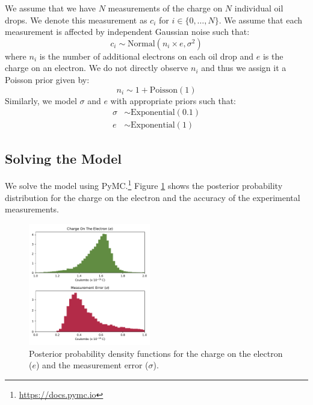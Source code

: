 \documentclass[10pt, twocolumn, a4paper]{article}
\begin{document}
We assume that we have $N$ measurements of the charge on $N$ individual oil drops. We denote this measurement as $c_i$ for $i \in \{0, \dots, N\}$. We assume that each measurement is affected by independent Gaussian noise such that:
\begin{equation}
c_i \sim \text{Normal}(n_i \times e, \sigma^2)
\end{equation}
where $n_i$ is the number of additional electrons on each oil drop and $e$ is the charge on an electron. We do not directly observe $n_i$ and thus we assign it a Poisson prior given by:
\begin{equation}
n_i \sim 1 + \text{Poisson}(1)
\end{equation}
Similarly, we model $\sigma$ and $e$ with appropriate priors such that:
\begin{align}
\sigma & \sim \text{Exponential}(0.1) \\
e & \sim \text{Exponential}(1) 
\end{align}

\subsection{Solving the Model}

We solve the model using PyMC.\footnote{\url{https://docs.pymc.io}} Figure \ref{results} shows the posterior probability distribution for the charge on the electron and the accuracy of the experimental measurements.

\begin{figure}[tp]
\begin{center}
\includegraphics[width=0.475\textwidth]{./figures/results.pdf}
\caption{Posterior probability density functions for the charge on the electron ($e$) and the measurement error ($\sigma$).}
\label{results}
\end{center}
\end{figure}

\printbibliography[title={References}] 
\end{document}

